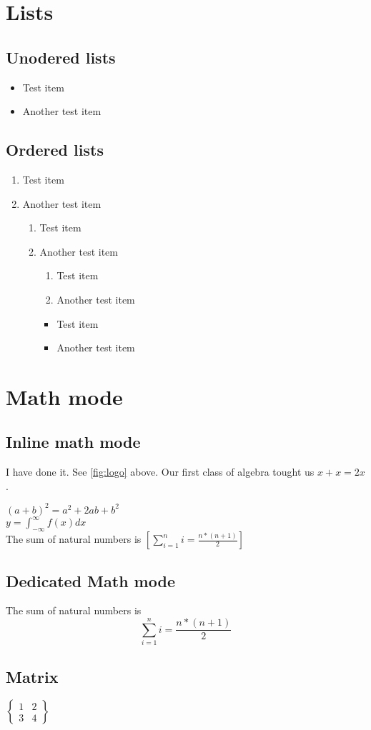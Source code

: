 \documentclass[a4,12pt]{report}
\begin{document}
	\chapter{Lists}
		\section{Unodered lists}
		\begin{itemize}
			\item Test item
			\item Another test item
		\end{itemize}
		\section{Ordered lists}
		\begin{enumerate}
			\item Test item
			\item Another test item
			\begin{enumerate}
				
			\item Test item
			\item Another test item
				\begin{enumerate}
				
			\item Test item
			\item Another test item
				\end{enumerate}
				\begin{itemize}
				
			\item Test item
			\item Another test item
				\end{itemize}
			\end{enumerate}
		\end{enumerate}
	\chapter{Math mode}
	\section{Inline math mode}
	I have done it. See \ref{fig:logo} above.
	Our first class of algebra tought us $x+x=2x$.
	
	\noindent $(a+b)^2=a^2+2ab+b^2$ \\
	
	$y=\int^{\infty}_{-\infty} f(x)dx$ \\

	The sum of natural numbers is $\left[\sum^n_{i=1} i = \frac{n*(n+1)}{2}\right]$
	\section{Dedicated Math mode}
	The sum of natural numbers is $$\sum^n_{i=1} i = \frac{n*(n+1)}{2}$$
	\section{Matrix}
	$\begin{Bmatrix}
		1 & 2 \\
		3 & 4
	\end{Bmatrix}$
\end{document}
